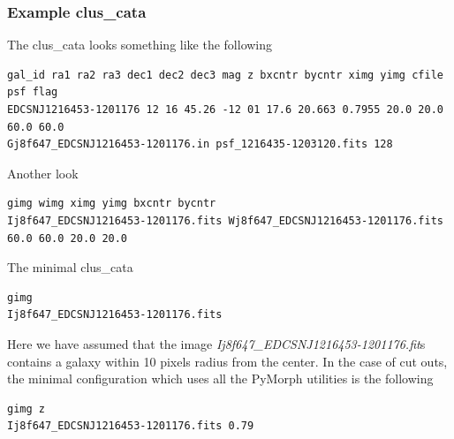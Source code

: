 \documentclass[a4paper,12pt]{article}
\begin{document}
\subsubsection*{Example clus\_cata}
The clus\_cata looks something like the following
\begin{footnotesize}
\begin{verbatim}
gal_id ra1 ra2 ra3 dec1 dec2 dec3 mag z bxcntr bycntr ximg yimg cfile psf flag
EDCSNJ1216453-1201176 12 16 45.26 -12 01 17.6 20.663 0.7955 20.0 20.0 60.0 60.0 
Gj8f647_EDCSNJ1216453-1201176.in psf_1216435-1203120.fits 128
\end{verbatim}
\end{footnotesize}
Another look
\begin{footnotesize}
\begin{verbatim}
gimg wimg ximg yimg bxcntr bycntr
Ij8f647_EDCSNJ1216453-1201176.fits Wj8f647_EDCSNJ1216453-1201176.fits 60.0 60.0 20.0 20.0
\end{verbatim}
\end{footnotesize}
The minimal clus\_cata
\begin{footnotesize}
\begin{verbatim}
gimg
Ij8f647_EDCSNJ1216453-1201176.fits
\end{verbatim}
\end{footnotesize}
Here we have assumed that the image \textit{Ij8f647\_EDCSNJ1216453-1201176.fit}s contains a galaxy within 10 pixels
 radius from the center. In the case of cut outs, the minimal configuration which uses all the PyMorph utilities is the following
\begin{footnotesize}
\begin{verbatim}
gimg z
Ij8f647_EDCSNJ1216453-1201176.fits 0.79
\end{verbatim}
\end{footnotesize}
\end{document}
